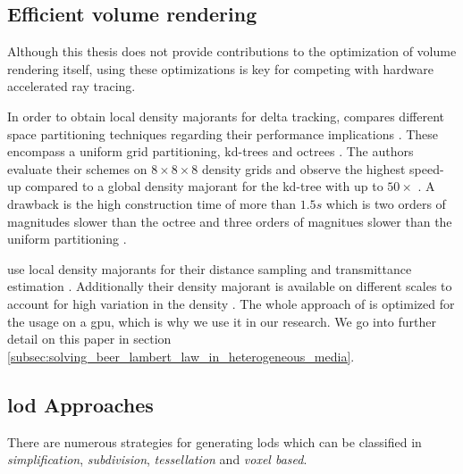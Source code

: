 \subsection{Efficient volume rendering}
Although this thesis does not provide contributions to the optimization of volume rendering itself, using these optimizations is key for competing with hardware accelerated ray tracing.

In order to obtain local density majorants for delta tracking, \citeauthor{yue_space_partitioning} compares different space partitioning techniques regarding their performance implications \cite{yue_space_partitioning}.
These encompass a uniform grid partitioning, kd-trees and octrees \citeauthor{yue_space_partitioning}.
The authors evaluate their schemes on $8\times8\times8$ density grids and observe the highest speed-up compared to a global density majorant for the kd-tree with up to $50\times$ \cite{yue_space_partitioning}.
A drawback is the high construction time of more than $1.5s$ which is two orders of magnitudes slower than the octree and three orders of magnitues slower than the uniform partitioning \cite{yue_space_partitioning}.

\citeauthor{brick_grid} use local density majorants for their distance sampling and transmittance estimation \cite{brick_grid}.
Additionally their density majorant is available on different scales to account for high variation in the density \cite{brick_grid}.
The whole approach of \citeauthor{brick_grid} is optimized for the usage on a \ac{gpu}, which is why we use it in our research.
We go into further detail on this paper in section \ref{subsec:solving_beer_lambert_law_in_heterogeneous_media}.

\subsection{\acl{lod} Approaches}
There are numerous strategies for generating lods which can be classified in \textit{simplification}, \textit{subdivision}, \textit{tessellation} and \textit{voxel based}.

